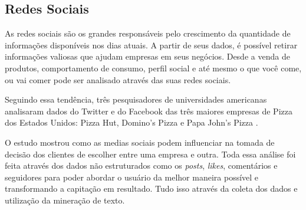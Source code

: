 \documentclass[conference]{IEEEtran}
\begin{document}
\subsection{Redes Sociais}
As redes sociais são os grandes responsáveis pelo crescimento da quantidade de informações disponíveis nos dias atuais. A partir de seus dados, é possível retirar informações valiosas que ajudam empresas em seus negócios. Desde a venda de produtos, comportamento de consumo, perfil social e até mesmo o que você come, ou vai comer pode ser analisado através das suas redes sociais.

Seguindo essa tendência, três pesquisadores de universidades americanas analisaram dados do Twitter e do Facebook das três maiores empresas de Pizza dos Estados Unidos: Pizza Hut, Domino's Pizza e Papa John's Pizza \cite{art11}.

O estudo mostrou como as medias sociais podem influenciar na tomada de decisão dos clientes de escolher entre uma empresa e outra. Toda essa análise foi feita através dos dados não estruturados como os \textit{posts}, \textit{likes}, comentários e seguidores para poder abordar o usuário da melhor maneira possível e transformando a capitação em resultado.  Tudo isso através da coleta dos dados e utilização da mineração de texto.




\end{document}
